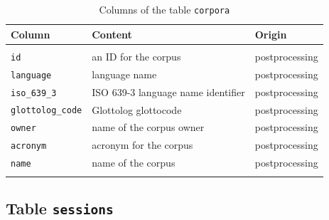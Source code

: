 \documentclass[a4paper, 11pt]{book}
\begin{document}
\begin{longtable}{lp{.5\linewidth}p{.2\linewidth}}
	\toprule
		\textbf{Column} & \textbf{Content} 	& \textbf{Origin} \\
	\midrule
	\endhead
		
	\bottomrule\\[-0.15cm]
	\caption{Columns of the table \texttt{corpora}}
	\endfoot

		\texttt{id} & an ID for the corpus & postprocessing \\
		\texttt{language} & language name & postprocessing \\
		\texttt{iso\_639\_3} & ISO 639-3 language name identifier & postprocessing \\
		\texttt{glottolog\_code} & Glottolog glottocode & postprocessing \\
		\texttt{owner} & name of the corpus owner & postprocessing \\
		\texttt{acronym} & acronym for the corpus & postprocessing \\
		\texttt{name} & name of the corpus & postprocessing \\
		\label{tab:Table corpora}
\end{longtable}


\subsection{Table \texttt{sessions}}
\label{subsec:Table sessions}
\end{document}
